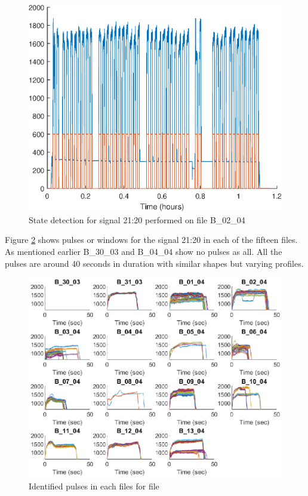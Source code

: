 \documentclass{article}
\begin{document}
\begin{figure}[H]
    \centering
    \includegraphics[width=\textwidth, height=\textheight, keepaspectratio]{figures/StateDetectionFig_B_02_04.eps}
    \caption{State detection for signal 21:20 performed on file B\_02\_04}
    \label{fig:StateDetectionFig_B_02_04}
\end{figure}

Figure \ref{fig:IdentifiedPulses} shows pulses or windows for the signal 21:20 in each of the fifteen files. As mentioned earlier B\_30\_03 and B\_04\_04 show no pulses as all. All the pulses are around 40 seconds in duration with similar shapes but varying profiles.
 
\begin{figure}[H]
    \centering
    \includegraphics[width=\textwidth, height=\textheight, keepaspectratio]{figures/IdentifiedPulsesFig.eps}
    \caption{Identified pulses in each files for file}
    \label{fig:IdentifiedPulses}
\end{figure}
\end{document}
